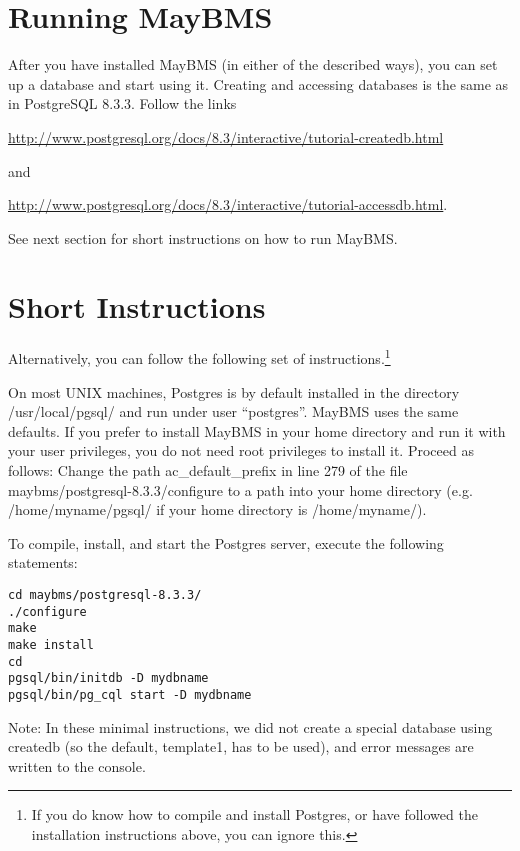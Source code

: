 \section{Running MayBMS}

After you have installed MayBMS (in either of the described ways), you can
set up a database and start using it.
Creating and accessing databases is the same as in PostgreSQL 8.3.3. Follow the links

\medskip

\url{http://www.postgresql.org/docs/8.3/interactive/tutorial-createdb.html}

\medskip

\noindent
and 

\medskip

\url{http://www.postgresql.org/docs/8.3/interactive/tutorial-accessdb.html}.

See next section for short instructions on how to run MayBMS.

\section{Short Instructions}


Alternatively, you can follow the following set of instructions.\footnote{If
you do know how to compile and install Postgres, or have followed the
installation instructions above, you can ignore this.}


On most UNIX machines, Postgres
is by default installed in the directory /usr/local/pgsql/
and run under user ``postgres''.
MayBMS uses the same defaults.
If you prefer to install MayBMS
in your home directory and run it with your user privileges, you do not
need root privileges to install it. Proceed as follows:
Change the path ac\_default\_prefix in line 279 of the file
maybms/postgresql-8.3.3/configure to a path into your home directory
(e.g. /home/myname/pgsql/ if your home directory is /home/myname/).

To compile, install, and start the Postgres server, execute the
following statements:
\begin{verbatim}
cd maybms/postgresql-8.3.3/
./configure
make
make install
cd
pgsql/bin/initdb -D mydbname
pgsql/bin/pg_cql start -D mydbname
\end{verbatim}

Note: In these minimal instructions, we did not create a special database
using createdb (so the default, template1, has to be used), and error
messages are written to the console.

